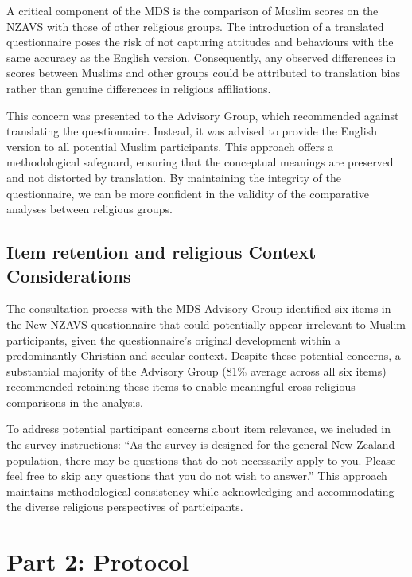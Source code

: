 \documentclass[
]{interact}
\begin{document}
A critical component of the MDS is the comparison of Muslim scores on
the NZAVS with those of other religious groups. The introduction of a
translated questionnaire poses the risk of not capturing attitudes and
behaviours with the same accuracy as the English version. Consequently,
any observed differences in scores between Muslims and other groups
could be attributed to translation bias rather than genuine differences
in religious affiliations.

This concern was presented to the Advisory Group, which recommended
against translating the questionnaire. Instead, it was advised to
provide the English version to all potential Muslim participants. This
approach offers a methodological safeguard, ensuring that the conceptual
meanings are preserved and not distorted by translation. By maintaining
the integrity of the questionnaire, we can be more confident in the
validity of the comparative analyses between religious groups.

\subsection{Item retention and religious Context
Considerations}\label{item-retention-and-religious-context-considerations}

The consultation process with the MDS Advisory Group identified six
items in the New NZAVS questionnaire that could potentially appear
irrelevant to Muslim participants, given the questionnaire's original
development within a predominantly Christian and secular context.
Despite these potential concerns, a substantial majority of the Advisory
Group (81\% average across all six items) recommended retaining these
items to enable meaningful cross-religious comparisons in the analysis.

To address potential participant concerns about item relevance, we
included in the survey instructions: ``As the survey is designed for the
general New Zealand population, there may be questions that do not
necessarily apply to you. Please feel free to skip any questions that
you do not wish to answer.'' This approach maintains methodological
consistency while acknowledging and accommodating the diverse religious
perspectives of participants.

\section{Part 2: Protocol}\label{part-2-protocol}
\end{document}
